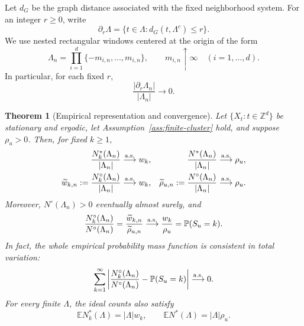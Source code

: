 \documentclass[aap,preprint]{imsart}
\theoremstyle{plain}
\newtheorem{theorem}{Theorem}[section]
\theoremstyle{definition}
\def\E{{\mathbb E}}
\def\P{{\mathbb P}}
\def\Z{{\mathbb Z}}
\begin{document}
	Let $d_G$ be the graph distance associated with the fixed neighborhood
	system. For an integer $r\geq0$, write
	\begin{equation}\label{eq:empirical-window-boundary}
		\partial_r\Lambda
		=\{t\in\Lambda:d_G(t,\Lambda^c)\leq r\}.
	\end{equation}
	We use nested rectangular windows centered at the origin of the form
	\begin{equation}\label{eq:empirical-rectangular-windows}
		\Lambda_n
		=\prod_{i=1}^d\{-m_{i,n},\ldots,m_{i,n}\},
		\qquad m_{i,n}\uparrow\infty\quad(i=1,\ldots,d).
	\end{equation}
	In particular,
	for each fixed $r$,
	\begin{equation}\label{eq:empirical-boundary-negligible}
		\frac{|\partial_r\Lambda_n|}{|\Lambda_n|}\longrightarrow0.
	\end{equation}
	
	\begin{theorem}[Empirical representation and convergence]
		\label{thm:empirical-cluster-counts}
		Let $\{X_t:t\in\Z^d\}$ be stationary and ergodic, let
		Assumption~\ref{ass:finite-cluster} hold, and suppose
		$\rho_u>0$. Then, for fixed $k\geq1$,
		\begin{align}
			\frac{N_k^*(\Lambda_n)}{|\Lambda_n|}
			&\overset{\rm a.s.}{\longrightarrow}w_k,
			&
			\frac{N^*(\Lambda_n)}{|\Lambda_n|}
			&\overset{\rm a.s.}{\longrightarrow}\rho_u,
			\label{eq:ideal-count-limits}\\
			\widetilde w_{k,n}
			:=\frac{N_k^\circ(\Lambda_n)}{|\Lambda_n|}
			&\overset{\rm a.s.}{\longrightarrow}w_k,
			&
			\widetilde\rho_{u,n}
			:=\frac{N^\circ(\Lambda_n)}{|\Lambda_n|}
			&\overset{\rm a.s.}{\longrightarrow}\rho_u.
			\label{eq:w-empirical}
		\end{align}
		Moreover, $N^\circ(\Lambda_n)>0$ eventually almost surely, and
		\begin{equation}\label{eq:empirical}
			\frac{N_k^\circ(\Lambda_n)}{N^\circ(\Lambda_n)}
			=\frac{\widetilde w_{k,n}}{\widetilde\rho_{u,n}}
			\overset{\rm a.s.}{\longrightarrow}
			\frac{w_k}{\rho_u}
			=\P(S_u=k).
		\end{equation}
		In fact, the whole empirical probability mass function is consistent in
		total variation:
		\begin{equation}\label{eq:empirical-total-variation}
			\sum_{k=1}^{\infty}
			\left|
			\frac{N_k^\circ(\Lambda_n)}{N^\circ(\Lambda_n)}
			-\P(S_u=k)
			\right|
			\overset{\rm a.s.}{\longrightarrow}0.
		\end{equation}
		For every finite $\Lambda$, the ideal counts also satisfy
		\begin{equation}\label{eq:ideal-count-expectations}
			\E N_k^*(\Lambda)=|\Lambda|w_k,
			\qquad
			\E N^*(\Lambda)=|\Lambda|\rho_u.
		\end{equation}
	\end{theorem}
	
\end{document}
